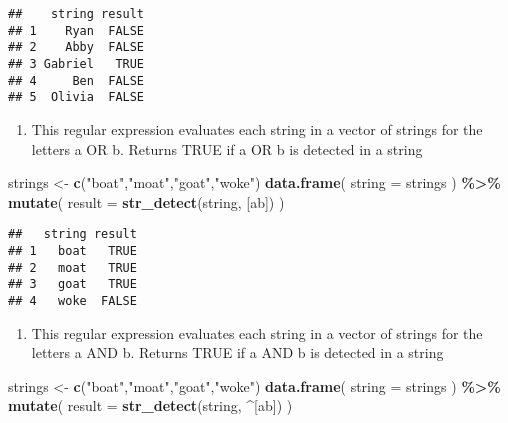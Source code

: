 \documentclass[
]{article}
\newenvironment{Shaded}{\begin{snugshade}}{\end{snugshade}}
\newcommand{\AttributeTok}[1]{\textcolor[rgb]{0.13,0.29,0.53}{#1}}
\newcommand{\FunctionTok}[1]{\textcolor[rgb]{0.13,0.29,0.53}{\textbf{#1}}}
\newcommand{\NormalTok}[1]{#1}
\newcommand{\OtherTok}[1]{\textcolor[rgb]{0.56,0.35,0.01}{#1}}
\newcommand{\SpecialCharTok}[1]{\textcolor[rgb]{0.81,0.36,0.00}{\textbf{#1}}}
\newcommand{\StringTok}[1]{\textcolor[rgb]{0.31,0.60,0.02}{#1}}
\providecommand{\tightlist}{%
  \setlength{\itemsep}{0pt}\setlength{\parskip}{0pt}}
\begin{document}
\begin{verbatim}
##    string result
## 1    Ryan  FALSE
## 2    Abby  FALSE
## 3 Gabriel   TRUE
## 4     Ben  FALSE
## 5  Olivia  FALSE
\end{verbatim}

\begin{enumerate}
\def\labelenumi{\alph{enumi})}
\setcounter{enumi}{2}
\tightlist
\item
  This regular expression evaluates each string in a vector of strings
  for the letters a OR b. Returns TRUE if a OR b is detected in a string
\end{enumerate}

\begin{Shaded}
\begin{Highlighting}[]
\NormalTok{strings }\OtherTok{\textless{}{-}} \FunctionTok{c}\NormalTok{(}\StringTok{"boat"}\NormalTok{,}\StringTok{"moat"}\NormalTok{,}\StringTok{"goat"}\NormalTok{,}\StringTok{"woke"}\NormalTok{)}
\FunctionTok{data.frame}\NormalTok{( }\AttributeTok{string =}\NormalTok{ strings ) }\SpecialCharTok{\%\textgreater{}\%}
  \FunctionTok{mutate}\NormalTok{( }\AttributeTok{result =} \FunctionTok{str\_detect}\NormalTok{(string, }\StringTok{\textquotesingle{}[ab]\textquotesingle{}}\NormalTok{) )}
\end{Highlighting}
\end{Shaded}

\begin{verbatim}
##   string result
## 1   boat   TRUE
## 2   moat   TRUE
## 3   goat   TRUE
## 4   woke  FALSE
\end{verbatim}

\begin{enumerate}
\def\labelenumi{\alph{enumi})}
\setcounter{enumi}{3}
\tightlist
\item
  This regular expression evaluates each string in a vector of strings
  for the letters a AND b. Returns TRUE if a AND b is detected in a
  string
\end{enumerate}

\begin{Shaded}
\begin{Highlighting}[]
\NormalTok{strings }\OtherTok{\textless{}{-}} \FunctionTok{c}\NormalTok{(}\StringTok{"boat"}\NormalTok{,}\StringTok{"moat"}\NormalTok{,}\StringTok{"goat"}\NormalTok{,}\StringTok{"woke"}\NormalTok{)}
\FunctionTok{data.frame}\NormalTok{( }\AttributeTok{string =}\NormalTok{ strings ) }\SpecialCharTok{\%\textgreater{}\%}
  \FunctionTok{mutate}\NormalTok{( }\AttributeTok{result =} \FunctionTok{str\_detect}\NormalTok{(string, }\StringTok{\textquotesingle{}\^{}[ab]\textquotesingle{}}\NormalTok{) )}
\end{Highlighting}
\end{Shaded}
\end{document}
